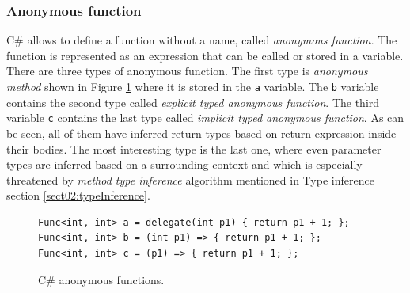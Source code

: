 \subsubsection*{Anonymous function}
C\# allows to define a function without a name, called \textit{anonymous function}.
The function is represented as an expression that can be called or stored in a variable.
There are three types of anonymous function.
The first type is \textit{anonymous method} shown in Figure \ref{img06:anonymousF} where it is stored in the \texttt{a} variable.
The \texttt{b} variable contains the second type called \textit{explicit typed anonymous function}.
The third variable \texttt{c} contains the last type called \textit{implicit typed anonymous function}.
As can be seen, all of them have inferred return types based on return expression inside their bodies.
The most interesting type is the last one, where even parameter types are inferred based on a surrounding context and which is especially threatened by \textit{method type inference} algorithm mentioned in Type inference section \ref{sect02:typeInference}.
\begin{figure}[h]
\begin{lstlisting}[style=csharp]
Func<int, int> a = delegate(int p1) { return p1 + 1; };
Func<int, int> b = (int p1) => { return p1 + 1; };
Func<int, int> c = (p1) => { return p1 + 1; };
\end{lstlisting}
\caption{C\# anonymous functions.}
\label{img06:anonymousF}
\end{figure}

